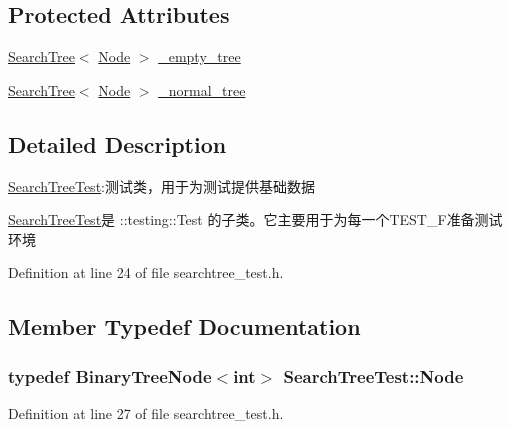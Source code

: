 \subsection*{Protected Attributes}
\begin{DoxyCompactItemize}
\item 
\hyperlink{class_introdunction_to_algorithm_1_1_tree_algorithm_1_1_search_tree}{Search\+Tree}$<$ \hyperlink{class_search_tree_test_a921d5813f947eb9b70417b69722bc050}{Node} $>$ \hyperlink{class_search_tree_test_a08832932ab11e000dcd1ba60da8bad5f}{\+\_\+empty\+\_\+tree}
\item 
\hyperlink{class_introdunction_to_algorithm_1_1_tree_algorithm_1_1_search_tree}{Search\+Tree}$<$ \hyperlink{class_search_tree_test_a921d5813f947eb9b70417b69722bc050}{Node} $>$ \hyperlink{class_search_tree_test_a9982df0c932b171ff29dfe7abcebdc05}{\+\_\+normal\+\_\+tree}
\end{DoxyCompactItemize}


\subsection{Detailed Description}
\hyperlink{class_search_tree_test}{Search\+Tree\+Test}\+:测试类，用于为测试提供基础数据 

{\ttfamily \hyperlink{class_search_tree_test}{Search\+Tree\+Test}}是 {\ttfamily \+::testing\+::\+Test} 的子类。它主要用于为每一个{\ttfamily T\+E\+S\+T\+\_\+\+F}准备测试环境 

Definition at line 24 of file searchtree\+\_\+test.\+h.



\subsection{Member Typedef Documentation}
\hypertarget{class_search_tree_test_a921d5813f947eb9b70417b69722bc050}{}
\subsubsection[{Node}]{\setlength{\rightskip}{0pt plus 5cm}typedef {\bf Binary\+Tree\+Node}$<$int$>$ {\bf Search\+Tree\+Test\+::\+Node}}\label{class_search_tree_test_a921d5813f947eb9b70417b69722bc050}


Definition at line 27 of file searchtree\+\_\+test.\+h.



